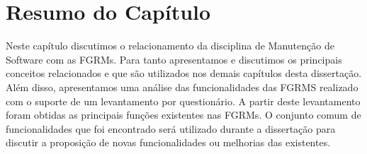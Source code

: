 \section{Resumo do Capítulo}
\label{sec:resumo_do_capitulo}

Neste capítulo discutimos o relacionamento da disciplina de Manutenção de
Software com as FGRMs. Para tanto apresentamos e discutimos os principais
conceitos relacionados e que são utilizados nos demais capítulos desta
dissertação. Além disso, apresentamos uma análise das funcionalidades das FGRMS
realizado com o suporte de um levantamento por questionário. A partir deste
levantamento foram obtidas as principais funções existentes nas FGRMs. O
conjunto comum de funcionalidades que foi encontrado será utilizado durante a
dissertação para discutir a proposição de novas funcionalidades ou melhorias das
existentes.
